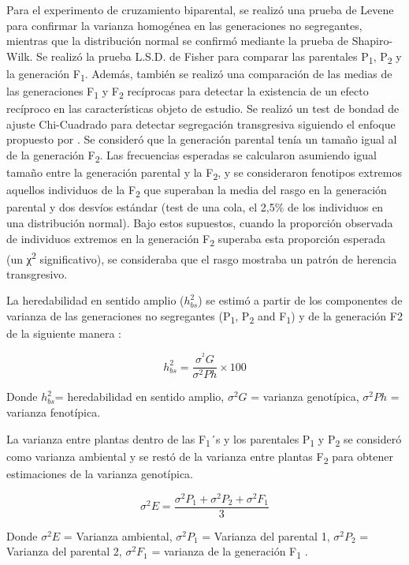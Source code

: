 \documentclass[12pt,oneside]{reedthesis}
\begin{document}
Para el experimento de cruzamiento biparental, se realizó una prueba de Levene para confirmar la varianza homogénea en las generaciones no segregantes, mientras que la distribución normal se confirmó mediante la prueba de Shapiro-Wilk. Se realizó la prueba L.S.D. de Fisher para comparar las parentales P\textsubscript{1}, P\textsubscript{2} y la generación F\textsubscript{1}. Además, también se realizó una comparación de las medias de las generaciones F\textsubscript{1} y F\textsubscript{2} recíprocas para detectar la existencia de un efecto recíproco en las características objeto de estudio. Se realizó un test de bondad de ajuste Chi-Cuadrado para detectar segregación transgresiva siguiendo el enfoque propuesto por \textcite{rodriguez2005} . Se consideró que la generación parental tenía un tamaño igual al de la generación F\textsubscript{2}. Las frecuencias esperadas se calcularon asumiendo igual tamaño entre la generación parental y la F\textsubscript{2}, y se consideraron fenotipos extremos aquellos individuos de la F\textsubscript{2} que superaban la media del rasgo en la generación parental y dos desvíos estándar (test de una cola, el 2,5\% de los individuos en una distribución normal). Bajo estos supuestos, cuando la proporción observada de individuos extremos en la generación F\textsubscript{2} superaba esta proporción esperada (un χ\textsuperscript{2} significativo), se consideraba que el rasgo mostraba un patrón de herencia transgresivo.

La heredabilidad en sentido amplio (\(h_{bs}^{2}\)) se estimó a partir de los componentes de varianza de las generaciones no segregantes (P\textsubscript{1}, P\textsubscript{2} and F\textsubscript{1}) y de la generación F2 de la siguiente manera \autocite{kearsey1996}:

\[ h_{bs}^{2}=\frac{\sigma^{^2}G}{\sigma^{2}Ph}\times100 \]

Donde \(h_{bs}^{2}\)= heredabilidad en sentido amplio, \(\sigma^{2}G\) = varianza genotípica, \(\sigma^{2}Ph\) = varianza fenotípica.

La varianza entre plantas dentro de las F\textsubscript{1}´s y los parentales P\textsubscript{1} y P\textsubscript{2} se consideró como varianza ambiental y se restó de la varianza entre plantas F\textsubscript{2} para obtener estimaciones de la varianza genotípica.

\[ \sigma^{2} E = \frac{\sigma^{2}P_1 + \sigma^{2}P_2 + \sigma^{2}F_1}{3} \]

Donde \(\sigma^{2}E\) = Varianza ambiental, \(\sigma^{2}P_1\) = Varianza del parental 1, \(\sigma^{2}P_2\) = Varianza del parental 2, \(\sigma^{2}F_1\) = varianza de la generación F\textsubscript{1} .
\end{document}
